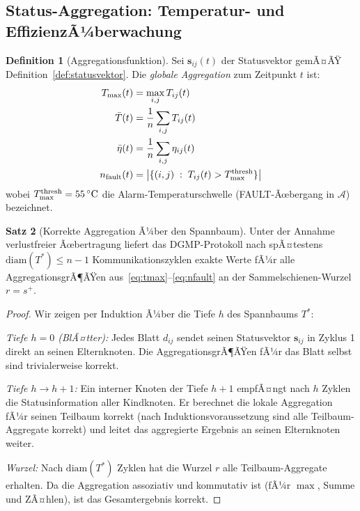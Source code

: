 ﻿\documentclass[a4paper,12pt]{article}
\theoremstyle{definition}
\newtheorem{definition}{Definition}[section]
\newtheorem{satz}[definition]{Satz}
\theoremstyle{remark}
\begin{document}
\subsection{Status-Aggregation: Temperatur- und EffizienzÃ¼berwachung}
\label{sec:komm_aggregation}

\begin{definition}[Aggregationsfunktion]
\label{def:aggregation}
Sei $\mathbf{s}_{ij}(t)$ der Statusvektor gemÃ¤ÃŸ Definition~\ref{def:statusvektor}.
Die \emph{globale Aggregation} zum Zeitpunkt $t$ ist:
\begin{align}
  T_{\max}(t)   &= \max_{i,j} T_{ij}(t)          \label{eq:tmax}\\
  \bar{T}(t)    &= \frac{1}{n}\sum_{i,j} T_{ij}(t) \label{eq:tmean}\\
  \bar{\eta}(t) &= \frac{1}{n}\sum_{i,j} \eta_{ij}(t) \label{eq:etamean}\\
  n_{\rm fault}(t) &= \bigl|\{(i,j)\;:\; T_{ij}(t) > T_{\max}^{\rm thresh}\}\bigr|
  \label{eq:nfault}
\end{align}
wobei $T_{\max}^{\rm thresh} = 55\,^{\circ}\mathrm{C}$ die Alarm-Temperaturschwelle
(FAULT-Ãœbergang in $\mathcal{A}$) bezeichnet.
\end{definition}

\begin{satz}[Korrekte Aggregation Ã¼ber den Spannbaum]
\label{satz:aggregation}
Unter der Annahme verlustfreier Ãœbertragung liefert das DGMP-Protokoll
nach spÃ¤testens $\mathrm{diam}(T^*) \leq n-1$ Kommunikationszyklen
exakte Werte fÃ¼r alle AggregationsgrÃ¶ÃŸen aus~\eqref{eq:tmax}--\eqref{eq:nfault}
an der Sammelschie\-nen-Wurzel $r = s^+$.
\end{satz}

\begin{proof}
Wir zeigen per Induktion Ã¼ber die Tiefe $h$ des Spannbaums $T^*$:

\emph{Tiefe $h=0$ (BlÃ¤tter):} Jedes Blatt $d_{ij}$ sendet seinen
Statusvektor $\mathbf{s}_{ij}$ in Zyklus 1 direkt an seinen Elternknoten.
Die AggregationsgrÃ¶ÃŸen fÃ¼r das Blatt selbst sind trivialerweise korrekt.

\emph{Tiefe $h \to h+1$:} Ein interner Knoten der Tiefe $h+1$ empfÃ¤ngt nach
$h$ Zyklen die Statusinformation aller Kindknoten. Er berechnet die lokale
Aggregation fÃ¼r seinen Teilbaum korrekt (nach Induktionsvoraussetzung sind
alle Teilbaum-Aggregate korrekt) und leitet das aggregierte Ergebnis an
seinen Elternknoten weiter.

\emph{Wurzel:} Nach $\mathrm{diam}(T^*)$ Zyklen hat die Wurzel $r$ alle
Teilbaum-Aggregate erhalten. Da die Aggregation assoziativ und kommutativ ist
(fÃ¼r $\max$, Summe und ZÃ¤hlen), ist das Gesamtergebnis korrekt.
\qedhere
\end{proof}
\end{document}
